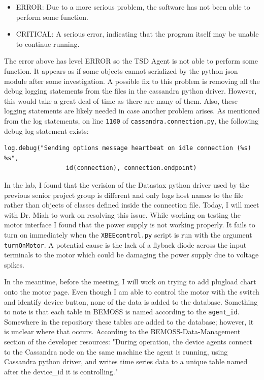 \documentclass[fontsize=11pt, %
                             paper=letter, %
                             twoside, %
                             captions=tableheading,
                             index=totoc,
                             hyperref]{labbook}
\begin{document}
\begin{addmargin}[0cm]{0cm}
\begin{itemize}
\item ERROR: Due to a more serious problem, the software has not been able to perform some function.
\item CRITICAL: A serious error, indicating that the program itself may be unable to continue running.
\end{itemize}
The error above has level ERROR so the TSD Agent is not able to perform some function.
\bigbreak\noindent
It appears as if some objects cannot serialized by the python json module after some investigation. A possible fix to this problem is removing all the debug logging statements from the files in the cassandra python driver. However, this would take a great deal of time as there are many of them. Also, these logging statements are likely needed in case another problem arises. As mentioned from the log statements, on line \texttt{1100} of \texttt{cassandra.connection.py}, the following debug log statement exists:
\begin{verbatim}
log.debug("Sending options message heartbeat on idle connection (%s) %s",
                 id(connection), connection.endpoint)
\end{verbatim}

In the lab, I found that the verision of the Datastax python driver used by the previous senior project group is different and only logs host names to the file rather than objects of classes defined inside the connection file. Today, I will meet with Dr. Miah to work on resolving this issue. While working on testing the motor interface I found that the power supply is not working properly. It fails to turn on immediately when the \texttt{XBEEcontrol.py} script is run with the argument \texttt{turnOnMotor}. A potential cause is the lack of a flyback diode across the input terminals to the motor which could be damaging the power supply due to voltage spikes.

In the meantime, before the meeting, I will work on trying to add plugload chart onto the motor page. Even though I am able to control the motor with the switch and identify device button, none of the data is added to the database. Something to note is that each table in BEMOSS is named according to the \texttt{agent\_id}. Somewhere in the repository these tables are added to the database; however, it is unclear where that occurs. According to the BEMOSS-Data-Management section of the developer resources: "During operation, the device agents connect to the Cassandra node on the same machine the agent is running, using Cassandra python driver, and writes time series data to a unique table named after the device\_id it is controlling."


\end{addmargin}
\end{document}

